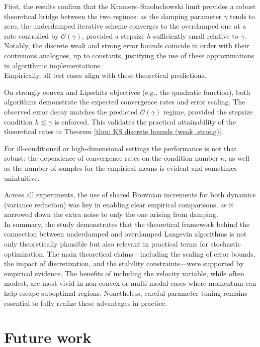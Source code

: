 \documentclass[12pt]{article}
\begin{document}
First, the results confirm that the Kramers--Smoluchowski limit provides a robust theoretical bridge between the two regimes: as the damping parameter $\gamma$ tends to zero, the underdamped iterative scheme converges to the overdamped one at a rate controlled by $\mathcal{O}(\gamma)$, provided a stepsize $h$ sufficiently small relative to $\gamma$.
Notably, the discrete weak and strong error bounds coincide in order with their continuous analogues, up to constants, justifying the use of these approximations in algorithmic implementations.\\

Empirically, all test cases align with these theoretical predictions.

On strongly convex and Lipschitz objectives (e.g., the quadratic function), both algorithms demonstrate the expected convergence rates and error scaling. The observed error decay matches the predicted $\mathcal{O}(\gamma)$ regime, provided the stepsize condition $h \lesssim \gamma$ is enforced. This validates the practical attainability of the theoretical rates in Theorem \ref{thm: KS discrete bounds (weak, strong)}.

For ill-conditioned or high-dimensional settings the performance is not that robust: the dependence of convergence rates on the condition number $\kappa$, as well as the number of samples for the empirical means is evident and sometimes unintuitive.

Across all experiments, the use of shared Brownian increments for both dynamics (variance reduction) was key in enabling clear empirical comparisons, as it narrowed down the extra noise to only the one arising from damping.\\

In summary, the study demonstrates that the theoretical framework behind the connection between underdamped and overdamped Langevin algorithms is not only theoretically plausible but also relevant in practical terms for stochastic optimization.
The main theoretical claims---including the scaling of error bounds, the impact of discretization, and the stability constraints---were supported by empirical evidence.
The benefits of including the velocity variable, while often modest, are most vivid in non-convex or multi-modal cases where momentum can help escape suboptimal regions.
Nonetheless, careful parameter tuning remains essential to fully realize these advantages in practice.

\section{Future work}
\end{document}

